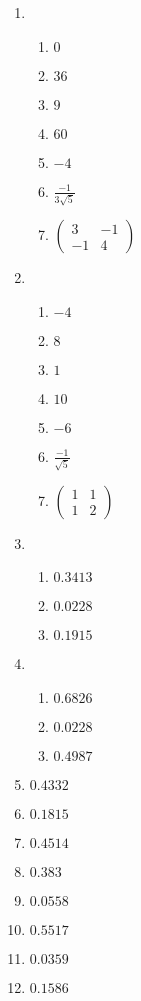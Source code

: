 \documentclass[12pt]{article}
\begin{document}
\begin{enumerate}
\item
\begin{enumerate}
\item   $0 $
\item   $36$
\item  $9 $
\item   $60 $
\item  $-4$
\item   $\frac{-1}{3\sqrt{5}}$
\item  $\begin{pmatrix}
 3 & -1 \\
-1 & 4
\end{pmatrix}$
\end{enumerate}

\item
\begin{enumerate}
\item $-4$
\item $8 $
\item $1 $
\item $10 $
\item $-6$
\item$ \frac{-1}{\sqrt{5}}$

\item $\begin{pmatrix}
 1 & 1 \\
 1 & 2
\end{pmatrix}$
\end{enumerate}
\item
\begin{enumerate}
\item $0.3413$
\item $0.0228$
\item $0.1915$
\end{enumerate}

\item
\begin{enumerate}
\item $0.6826$
\item $0.0228  $
\item $0.4987  $
\end{enumerate}

\item $0.4332 $
\item $0.1815  $
\item $0.4514 $
\item $0.383  $
\item $0.0558 $
\item $0.5517$
\item $0.0359 $
\item $0.1586$


\end{enumerate}
\end{document}
